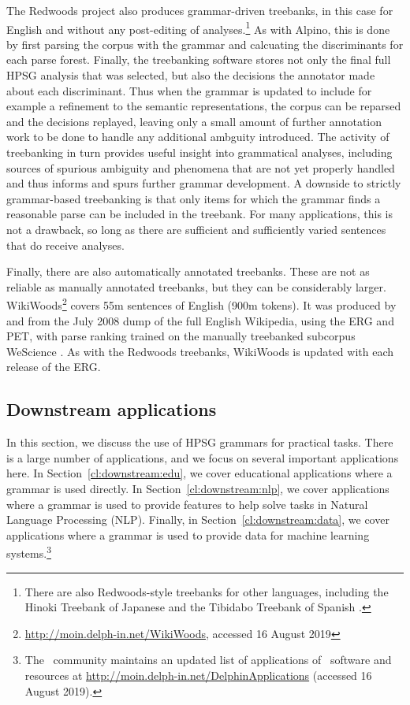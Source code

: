 \documentclass[output=paper,nonflat]{langsci/langscibook}
\begin{document}
The Redwoods project \citep{OFTM2004a-u} also produces grammar-driven
treebanks, in this case for English and without any post-editing of
analyses.\footnote{There are also Redwoods-style treebanks for other
  languages, including the Hinoki Treebank of Japanese
  \citep{bond:etal:2004} and the Tibidabo Treebank of Spanish
  \citep{marimon:2015}.}  As with Alpino, this is done by first
parsing the corpus with the grammar and calcuating the discriminants
for each parse forest.  Finally, the treebanking software stores not
only the final full HPSG analysis that was selected, but also the
decisions the annotator made about each discriminant. Thus when the
grammar is updated to include for example a refinement to the semantic
representations, the corpus can be reparsed and the decisions
replayed, leaving only a small amount of further annotation work to be
done to handle any additional ambguity introduced. The activity of
treebanking in turn provides useful insight into grammatical analyses,
including sources of spurious ambiguity and phenomena that are not yet
properly handled and thus informs and spurs further grammar
development.  A downside to strictly grammar-based treebanking is that
only items for which the grammar finds a reasonable parse can be
included in the treebank. For many applications, this is not a
drawback, so long as there are sufficient and sufficiently varied
sentences that do receive analyses.

Finally, there are also automatically annotated treebanks.
These are not as reliable as manually annotated treebanks,
but they can be considerably larger.
WikiWoods\footnote{\url{http://moin.delph-in.net/WikiWoods}, accessed 16 August 2019}
covers 55m sentences of English (900m tokens).
It was produced by \citet{flickinger2010wikiwoods} and \citet{solberg2012wikiwoods}
from the July 2008 dump of the full English Wikipedia,
using the ERG and PET,
with parse ranking trained on the manually treebanked subcorpus WeScience \citep{ytrestol2009wescience}.
As with the Redwoods treebanks, WikiWoods is updated with each release of the ERG.



\subsection{Downstream applications}
\label{cl:downstream}

In this section, we discuss
the use of HPSG grammars for practical tasks.
There is a large number of applications,
and we focus on several important applications here.
In Section~\ref{cl:downstream:edu},
we cover educational applications where a grammar is used directly.
In Section~\ref{cl:downstream:nlp},
we cover applications where a grammar is used to provide features
to help solve tasks in Natural Language Processing (NLP).
Finally, in Section~\ref{cl:downstream:data},
we cover applications where a grammar is used to provide data for machine learning systems.\footnote{The \delphin\ community maintains an updated list
of applications of \delphin\ software and resources at \url{http://moin.delph-in.net/DelphinApplications} (accessed 16 August 2019).}
\end{document}
